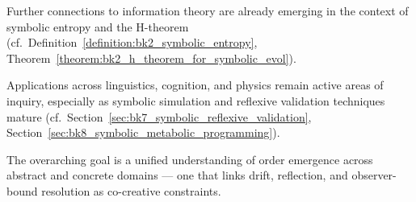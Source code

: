 Further connections to information theory are already emerging in the context of symbolic entropy and the H-theorem (cf.~Definition~\ref{definition:bk2_symbolic_entropy}, Theorem~\ref{theorem:bk2_h_theorem_for_symbolic_evol}).

Applications across linguistics, cognition, and physics remain active areas of inquiry, especially as symbolic simulation and reflexive validation techniques mature (cf.~Section~\ref{sec:bk7_symbolic_reflexive_validation}, Section~\ref{sec:bk8_symbolic_metabolic_programming}).

The overarching goal is a unified understanding of order emergence across abstract and concrete domains — one that links drift, reflection, and observer-bound resolution as co-creative constraints.